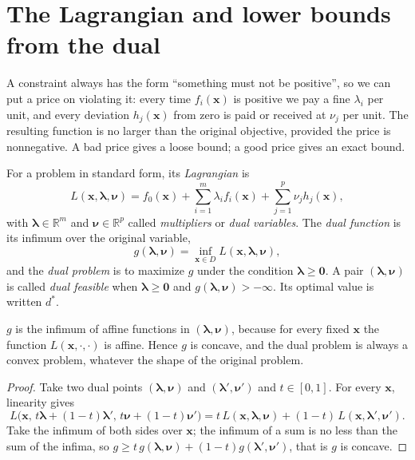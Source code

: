 \section{The Lagrangian and lower bounds from the dual}

A constraint always has the form ``something must not be positive'', so we can put a price on
violating it: every time $f_{i}(\mathbf{x})$ is positive we pay a fine $\lambda_{i}$ per
unit, and every deviation $h_{j}(\mathbf{x})$ from zero is paid or received at $\nu_{j}$ per
unit. The resulting function is no larger than the original objective, provided the price is
nonnegative. A bad price gives a loose bound; a good price gives an exact bound.

\begin{definisi}
For a problem in standard form, its \emph{Lagrangian} is
\[
  L(\mathbf{x},\boldsymbol{\lambda},\boldsymbol{\nu})
  =f_{0}(\mathbf{x})+\sum_{i=1}^{m}\lambda_{i}f_{i}(\mathbf{x})
   +\sum_{j=1}^{p}\nu_{j}h_{j}(\mathbf{x}),
\]
with $\boldsymbol{\lambda}\in\mathbb{R}^{m}$ and $\boldsymbol{\nu}\in\mathbb{R}^{p}$ called
\emph{multipliers} or \emph{dual variables}. The \emph{dual function} is its infimum over the
original variable,
\[
  g(\boldsymbol{\lambda},\boldsymbol{\nu})
  =\inf_{\mathbf{x}\in D}L(\mathbf{x},\boldsymbol{\lambda},\boldsymbol{\nu}),
\]
and the \emph{dual problem} is to maximize $g$ under the condition
$\boldsymbol{\lambda}\ge\mathbf{0}$. A pair $(\boldsymbol{\lambda},\boldsymbol{\nu})$ is
called \emph{dual feasible} when $\boldsymbol{\lambda}\ge\mathbf{0}$ and
$g(\boldsymbol{\lambda},\boldsymbol{\nu})>-\infty$. Its optimal value is written $d^{*}$.
\end{definisi}

\begin{proposisi}
$g$ is the infimum of affine functions in $(\boldsymbol{\lambda},\boldsymbol{\nu})$, because
for every fixed $\mathbf{x}$ the function $L(\mathbf{x},\cdot,\cdot)$ is affine. Hence $g$ is
concave, and the dual problem is always a convex problem, whatever the shape of the original
problem.
\end{proposisi}

\begin{proof}
Take two dual points $(\boldsymbol{\lambda},\boldsymbol{\nu})$ and
$(\boldsymbol{\lambda}',\boldsymbol{\nu}')$ and $t\in[0,1]$. For every $\mathbf{x}$,
linearity gives
\[
  L\bigl(\mathbf{x},\,t\boldsymbol{\lambda}+(1-t)\boldsymbol{\lambda}',\,
  t\boldsymbol{\nu}+(1-t)\boldsymbol{\nu}'\bigr)
  =t\,L(\mathbf{x},\boldsymbol{\lambda},\boldsymbol{\nu})
   +(1-t)\,L(\mathbf{x},\boldsymbol{\lambda}',\boldsymbol{\nu}').
\]
Take the infimum of both sides over $\mathbf{x}$; the infimum of a sum is no less than the sum
of the infima, so
$g\ge t\,g(\boldsymbol{\lambda},\boldsymbol{\nu})
+(1-t)g(\boldsymbol{\lambda}',\boldsymbol{\nu}')$, that is $g$ is concave.
\end{proof}

